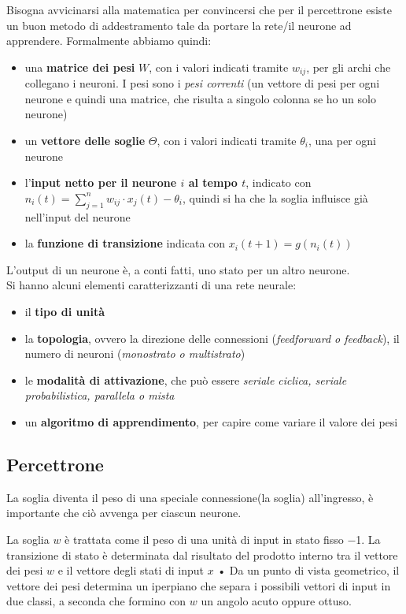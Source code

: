Bisogna avvicinarsi alla matematica per convincersi che per il percettrone esiste un buon metodo di addestramento tale da portare la rete/il neurone ad apprendere. Formalmente abbiamo quindi:

\begin{itemize} 
    \item una \textbf{matrice dei pesi} $W$, con i valori indicati tramite $w_{ij}$, per gli archi che collegano i neuroni. I pesi sono i \textit{pesi correnti} (un vettore di pesi per ogni neurone e quindi una matrice, che risulta a singolo colonna se ho un solo neurone) 
    \item un \textbf{vettore delle soglie} $\Theta$, con i valori indicati tramite $\theta_i$, una per ogni neurone 
    \item l'\textbf{input netto per il neurone $i$ al tempo $t$}, indicato con\\ $n_i(t)=\sum_{j=1}^n w_{ij}\cdot x_j(t)-\theta_i$, quindi si ha che la soglia influisce già nell'input del neurone
    \item la \textbf{funzione di transizione} indicata con $x_i(t+1)=g(n_i(t))$ 
\end{itemize} 

L'output di un neurone è, a conti fatti, uno stato per un altro neurone.\\ Si hanno alcuni elementi caratterizzanti di una rete neurale: 
\begin{itemize} 
    \item il \textbf{tipo di unità} 
    \item la \textbf{topologia}, ovvero la direzione delle connessioni (\textit{feedforward \textnormal{o} feedback}), il numero di neuroni (\textit{monostrato \textnormal{o} multistrato})
    \item le \textbf{modalità di attivazione}, che può essere \textit{seriale ciclica, seriale probabilistica, parallela \textnormal{o} mista} 
    \item un \textbf{algoritmo di apprendimento}, per capire come variare il valore dei pesi 
\end{itemize}

\subsection{Percettrone}
La soglia diventa il peso di una speciale connessione(la soglia) all'ingresso, è importante che ciò avvenga per ciascun neurone.

La soglia $w$ è trattata come il peso di una unità di input in stato fisso $-$1. La transizione di stato è determinata dal risultato del prodotto interno tra il vettore dei pesi $w$ e il vettore degli stati di input $x$ • Da un punto di vista geometrico, il vettore dei pesi determina un iperpiano che separa i possibili vettori di input in due classi, a seconda che formino con $w$ un angolo acuto oppure ottuso.

